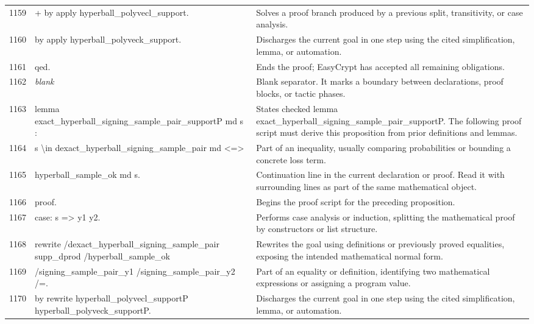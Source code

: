 \documentclass[10pt]{article}
\begin{document}
\begin{longtable}{r L{0.53\textwidth} L{0.37\textwidth}}
1159 & {\ttfamily\scriptsize + by apply hyperball\_polyvecl\_support.} & Solves a proof branch produced by a previous split, transitivity, or case analysis. \\
1160 & {\ttfamily\scriptsize by apply hyperball\_polyveck\_support.} & Discharges the current goal in one step using the cited simplification, lemma, or automation. \\
1161 & {\ttfamily\scriptsize qed.} & Ends the proof; EasyCrypt has accepted all remaining obligations. \\
1162 & {\ttfamily\scriptsize \emph{blank}} & Blank separator.  It marks a boundary between declarations, proof blocks, or tactic phases. \\
1163 & {\ttfamily\scriptsize lemma exact\_hyperball\_signing\_sample\_pair\_supportP md s :} & States checked lemma exact\_hyperball\_signing\_sample\_pair\_supportP.  The following proof script must derive this proposition from prior definitions and lemmas. \\
1164 & {\ttfamily\scriptsize   s \textbackslash{}in dexact\_hyperball\_signing\_sample\_pair md <=>} & Part of an inequality, usually comparing probabilities or bounding a concrete loss term. \\
1165 & {\ttfamily\scriptsize   hyperball\_sample\_ok md s.} & Continuation line in the current declaration or proof.  Read it with surrounding lines as part of the same mathematical object. \\
1166 & {\ttfamily\scriptsize proof.} & Begins the proof script for the preceding proposition. \\
1167 & {\ttfamily\scriptsize case: s => y1 y2.} & Performs case analysis or induction, splitting the mathematical proof by constructors or list structure. \\
1168 & {\ttfamily\scriptsize rewrite /dexact\_hyperball\_signing\_sample\_pair supp\_dprod /hyperball\_sample\_ok} & Rewrites the goal using definitions or previously proved equalities, exposing the intended mathematical normal form. \\
1169 & {\ttfamily\scriptsize         /signing\_sample\_pair\_y1 /signing\_sample\_pair\_y2 /=.} & Part of an equality or definition, identifying two mathematical expressions or assigning a program value. \\
1170 & {\ttfamily\scriptsize by rewrite hyperball\_polyvecl\_supportP hyperball\_polyveck\_supportP.} & Discharges the current goal in one step using the cited simplification, lemma, or automation. \\

\end{longtable}
\end{document}
